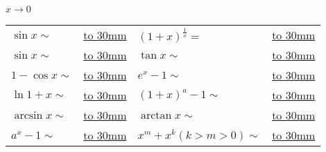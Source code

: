 \documentclass[a4paper]{article}
\begin{document}
\paragraph{$x \rightarrow 0$}

\begin{center}
    \begin{tabular}{ | p{2.5cm} | l | p{2.5cm} | l |}
        $\sin{x}\sim$ & 
        \underline{\hbox to 30mm{}} &
        $(1+x)^\frac{1}{x}=$ &
        \underline{\hbox to 30mm{}} \\
        $\sin{x} \sim$  &
        \underline{\hbox to 30mm{}} &
        $\tan{x} \sim$   &
        \underline{\hbox to 30mm{}} \\
        $1 - \cos{x} \sim $         &
        \underline{\hbox to 30mm{}} &
        $e^x - 1 \sim$              &
        \underline{\hbox to 30mm{}} \\
        $\ln{1+x} \sim$             &
        \underline{\hbox to 30mm{}} &
        $(1+x)^a - 1 \sim$          &
        \underline{\hbox to 30mm{}} \\
        $\arcsin{x} \sim$           &
        \underline{\hbox to 30mm{}} &
        $\arctan{x} \sim$           &
        \underline{\hbox to 30mm{}} \\
        $a^x - 1 \sim$              &
        \underline{\hbox to 30mm{}} &
        $x^m + x^k(k>m>0) \sim$       &
        \underline{\hbox to 30mm{}} \\
    \end{tabular}
\end{center}













\end{document}
